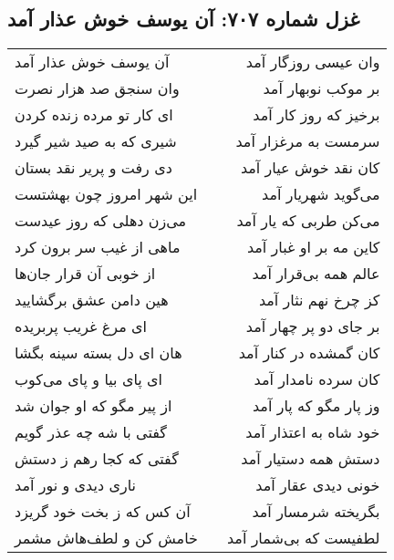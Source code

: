 \begin{center}
\section*{غزل شماره ۷۰۷: آن یوسف خوش عذار آمد}
\label{sec:0707}
\begin{longtable}{l p{0.5cm} r}
آن یوسف خوش عذار آمد
&&
وان عیسی روزگار آمد
\\
وان سنجق صد هزار نصرت
&&
بر موکب نوبهار آمد
\\
ای کار تو مرده زنده کردن
&&
برخیز که روز کار آمد
\\
شیری که به صید شیر گیرد
&&
سرمست به مرغزار آمد
\\
دی رفت و پریر نقد بستان
&&
کان نقد خوش عیار آمد
\\
این شهر امروز چون بهشتست
&&
می‌گوید شهریار آمد
\\
می‌زن دهلی که روز عیدست
&&
می‌کن طربی که یار آمد
\\
ماهی از غیب سر برون کرد
&&
کاین مه بر او غبار آمد
\\
از خوبی آن قرار جان‌ها
&&
عالم همه بی‌قرار آمد
\\
هین دامن عشق برگشایید
&&
کز چرخ نهم نثار آمد
\\
ای مرغ غریب پربریده
&&
بر جای دو پر چهار آمد
\\
هان ای دل بسته سینه بگشا
&&
کان گمشده در کنار آمد
\\
ای پای بیا و پای می‌کوب
&&
کان سرده نامدار آمد
\\
از پیر مگو که او جوان شد
&&
وز پار مگو که پار آمد
\\
گفتی با شه چه عذر گویم
&&
خود شاه به اعتذار آمد
\\
گفتی که کجا رهم ز دستش
&&
دستش همه دستیار آمد
\\
ناری دیدی و نور آمد
&&
خونی دیدی عقار آمد
\\
آن کس که ز بخت خود گریزد
&&
بگریخته شرمسار آمد
\\
خامش کن و لطف‌هاش مشمر
&&
لطفیست که بی‌شمار آمد
\\
\end{longtable}
\end{center}
